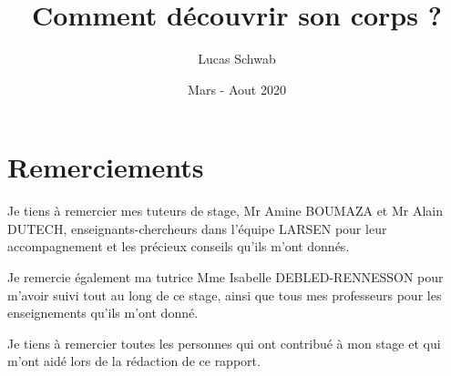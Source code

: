 \documentclass[11pt,french]{report}
\title{Comment découvrir son corps ?}
\author{Lucas Schwab}
\date{Mars - Aout 2020}
\begin{document}
\maketitle








\tableofcontents

\chapter{Remerciements}

Je tiens à remercier mes tuteurs de stage, Mr Amine BOUMAZA et Mr Alain DUTECH, enseignants-chercheurs dans l'équipe LARSEN pour leur accompagnement et les précieux conseils qu'ils m'ont donnés.

Je remercie également ma tutrice Mme Isabelle DEBLED-RENNESSON pour m'avoir suivi tout au long de ce stage, ainsi que tous mes professeurs pour les enseignements qu'ils m'ont donné.

Je tiens à remercier toutes les personnes qui ont contribué à mon stage et qui m'ont aidé lors de la rédaction de ce rapport.
\end{document}
